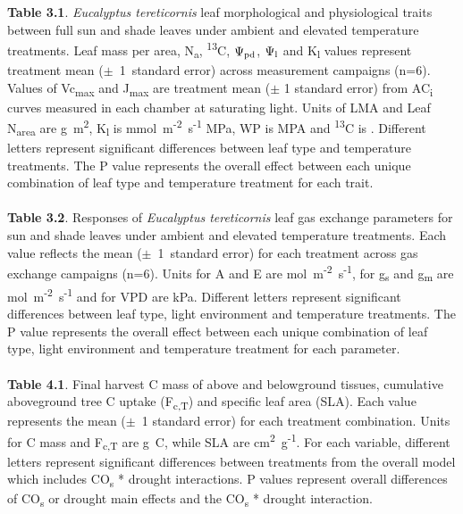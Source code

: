 \documentclass[a4paper]{article}\usepackage[]{graphicx}\usepackage[]{color}
\begin{document}
\textbf{Table 3.1}. \textit{Eucalyptus tereticornis} leaf morphological and physiological traits between full sun and shade leaves under ambient and elevated temperature treatments. Leaf mass per area, N\textsubscript{a}, {\textdelta}\textsuperscript{13}C, $\Psi\textsubscript{pd}$, $\Psi\textsubscript{l}$ and K\textsubscript{l} values represent treatment mean ($\pm$~1~standard error) across measurement campaigns (n=6). Values of Vc\textsubscript{max} and J\textsubscript{max} are treatment mean ($\pm$ 1 standard error) from AC\textsubscript{i} curves measured in each chamber at saturating light. Units of LMA and Leaf N\textsubscript{area} are g~m\textsuperscript{2}, K\textsubscript{l} is mmol~m\textsuperscript{-2}~s\textsuperscript{-1} MPa, WP is MPA and {\textdelta}\textsuperscript{13}C is \permil. Different letters represent significant differences between leaf type and temperature treatments. The P value represents the overall effect between each unique combination of leaf type and temperature treatment for each trait.
\\
\\
\textbf{Table 3.2}. Responses of \textit{Eucalyptus tereticornis} leaf gas exchange parameters for sun and shade leaves under ambient and elevated temperature treatments. Each value reflects the mean ($\pm$~1~standard error) for each treatment across gas exchange campaigns (n=6). Units for A and E are {\textmugreek}mol~m\textsuperscript{-2}~s\textsuperscript{-1}, for g\textsubscript{s} and g\textsubscript{m} are mol~m\textsuperscript{-2}~s\textsuperscript{-1} and for VPD are kPa. Different letters represent significant differences between leaf type, light environment and temperature treatments. The P value represents the overall effect between each unique combination of leaf type, light environment and temperature treatment for each parameter.
\\
\\
\textbf{Table 4.1}. Final harvest C mass of above and belowground tissues, cumulative aboveground tree C uptake (F\textsubscript{c,T}) and specific leaf area (SLA). Each value represents the mean ($\pm$~1 standard error) for each treatment combination. Units for C mass and F\textsubscript{c,T} are g~C, while SLA are cm\textsuperscript{2}~g\textsuperscript{-1}. For each variable, different letters represent significant differences between treatments from the overall model which includes CO\textsubscript{s} * drought interactions. P values represent overall differences of CO\textsubscript{s} or drought main effects and the CO\textsubscript{s} * drought interaction.
   
\end{document}
